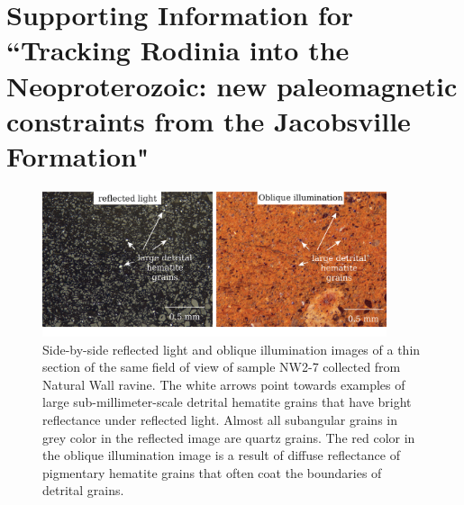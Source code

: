 \chapter[Supporting Information for ``Tracking Rodinia into the Neoproterozoic: new paleomagnetic constraints from the Jacobsville Formation"][Supporting Information--Jacobsville Formation]{Supporting Information for ``Tracking Rodinia into the Neoproterozoic: new paleomagnetic constraints from the Jacobsville Formation"}

\begin{figure}
\includegraphics[width=0.9\textwidth]{figure/Zhang2024a/SI_petrography.png}
\caption[Petrographic images of the fine-grained sandstone facies of the Jacobsville Formation]{Side-by-side reflected light and oblique illumination images of a thin section of the same field of view of sample NW2-7 collected from Natural Wall ravine. The white arrows point towards examples of large sub-millimeter-scale detrital hematite grains that have bright reflectance under reflected light. Almost all subangular grains in grey color in the reflected image are quartz grains. The red color in the oblique illumination image is a result of diffuse reflectance of pigmentary hematite grains that often coat the boundaries of detrital grains. }
\label{fig:SI_petrography}
\end{figure}


